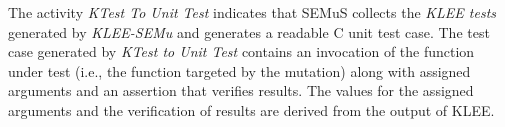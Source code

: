 The activity \emph{KTest To Unit Test} indicates that SEMuS collects the \emph{KLEE tests} generated by \emph{KLEE-SEMu} and generates a readable C unit test case. The test case generated by \emph{KTest to Unit Test} contains an invocation of the function under test (i.e., the function targeted  by the mutation) along with assigned arguments and an assertion that verifies results. The values for the assigned arguments and the verification of results are derived from the output of KLEE.










